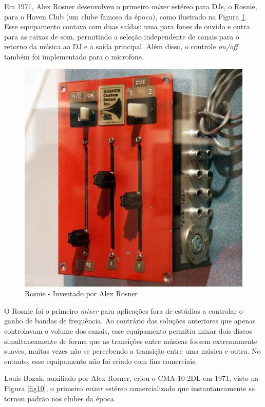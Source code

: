 Em 1971, Alex Rosner desenvolveu o primeiro \textit{mixer} estéreo para DJs, o Rosnie, para o Haven Club (um clube famoso da época), como ilustrado na Figura \ref{fig08}. Esse equipamento contava com duas saídas: uma para fones de ouvido e outra para as caixas de som, permitindo a seleção independente de canais para o retorno da música ao DJ e a saída principal. Além disso, o controle \textit{on/off} também foi implementado para o microfone.

\begin{figure}[h]
	\centering
    \includegraphics[scale=0.4]{figuras/fig08.eps}
	\caption{Rosnie - Inventado por Alex Rosner \cite{stoneyroadsStoryBehind}}
	\label{fig08}
\end{figure}

O Rosnie foi o primeiro \textit{mixer} para aplicações fora de estúdios a controlar o ganho de bandas de frequência. Ao contrário das soluções anteriores que apenas controlavam o volume dos canais, esse equipamento permitiu mixar dois discos simultaneamente de forma que as transições entre músicas fossem extremamente suaves, muitas vezes não se percebendo a transição entre uma música e outra. No entanto, esse equipamento não foi criado com fins comerciais.

Louis Bozak, auxiliado por Alex Rosner, criou o CMA-10-2DL em 1971, visto na Figura \ref{fig10}, o primeiro \textit{mixer} estéreo comercializado que instantaneamente se tornou padrão nos clubes da época.

